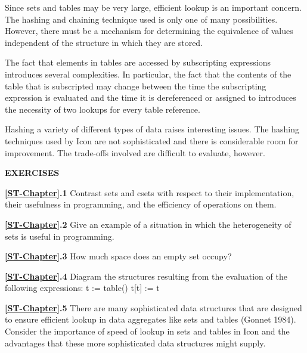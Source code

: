 Since sets and tables may be very large, efficient lookup is an
important concern. The hashing and chaining technique used is only one
of many possibilities. However, there must be a mechanism for
determining the equivalence of values independent of the structure in
which they are stored.

The fact that elements in tables are accessed by subscripting
expressions introduces several complexities. In particular, the fact
that the contents of the table that is subscripted may change between
the time the subscripting expression is evaluated and the time it is
dereferenced or assigned to introduces the necessity of two lookups
for every table reference.

Hashing a variety of different types of data raises interesting
issues. The hashing techniques used by Icon are not sophisticated and
there is considerable room for improvement. The trade-offs involved
are difficult to evaluate, however.

\bigskip

\noindent\textbf{EXERCISES}


\noindent\textbf{\ref*{ST-Chapter}.1}
Contrast sets and csets with respect to their implementation,
their usefulness in programming, and the efficiency of operations on
them.

\noindent\textbf{\ref*{ST-Chapter}.2}
Give an example of a situation in which the heterogeneity of
sets is useful in programming.

\noindent\textbf{\ref*{ST-Chapter}.3}
How much space does an empty set occupy?

\noindent\textbf{\ref*{ST-Chapter}.4}
Diagram the structures resulting from the evaluation of the
following expressions:\newline
 t := table()\newline
 t[t] := t

\noindent\textbf{\ref*{ST-Chapter}.5}
There are many sophisticated data structures that are designed
to ensure efficient lookup in data aggregates like sets and tables
(Gonnet 1984). Consider the importance of speed of lookup in sets and
tables in Icon and the advantages that these more sophisticated data
structures might supply.


